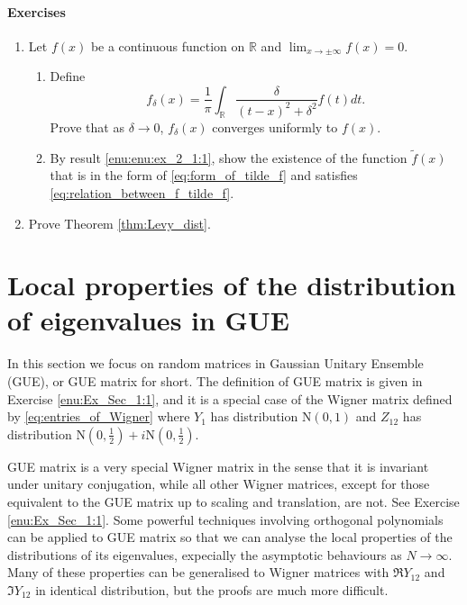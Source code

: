 \documentclass[11pt, a4paper]{article}
\numberwithin{equation}{section}
\newcommand{\realR}{\mathbb{R}}
\newcommand{\Normal}{\mathrm{N}}
\theoremstyle{definition}
\theoremstyle{remark}
\begin{document}
\paragraph{Exercises}

\begin{enumerate}
\item \label{enu:ex_2_1}
  Let $f(x)$ be a continuous function on $\realR$ and $\lim_{x \to \pm \infty} f(x) = 0$.
  \begin{enumerate}
  \item \label{enu:enu:ex_2_1:1}
    Define
    \begin{equation}
      f_{\delta}(x) = \frac{1}{\pi} \int_{\realR} \frac{\delta}{(t - x)^2 + \delta^2} f(t) dt.
    \end{equation}
    Prove that as $\delta \to 0$, $f_{\delta}(x)$ converges uniformly to $f(x)$.
  \item
    By result \ref{enu:enu:ex_2_1:1}, show the existence of the function $\tilde{f}(x)$ that is in the form of \eqref{eq:form_of_tilde_f} and satisfies \eqref{eq:relation_between_f_tilde_f}.
  \end{enumerate}
\item
  Prove Theorem \ref{thm:Levy_dist}.
\end{enumerate}

\section{Local properties of the distribution of eigenvalues in GUE} \label{sec:local_prop_GUE}

In this section we focus on random matrices in Gaussian Unitary Ensemble (GUE), or GUE matrix for short. The definition of GUE matrix is given in Exercise \ref{enu:Ex_Sec_1:1}, and it is a special case of the Wigner matrix defined by \eqref{eq:entries_of_Wigner} where $Y_1$ has distribution $\Normal(0, 1)$ and $Z_{12}$ has distribution $\Normal(0, \frac{1}{2}) + i\Normal(0, \frac{1}{2})$.

GUE matrix is a very special Wigner matrix in the sense that it is invariant under unitary conjugation, while all other Wigner matrices, except for those equivalent to the GUE matrix up to scaling and translation, are not. See Exercise \ref{enu:Ex_Sec_1:1}. Some powerful techniques involving orthogonal polynomials can be applied to GUE matrix so that we can analyse the local properties of the distributions of its eigenvalues, expecially the asymptotic behaviours as $N \to \infty$. Many of these properties can be generalised to Wigner matrices with $\Re Y_{12}$ and $\Im Y_{12}$ in identical distribution, but the proofs are much more difficult.
\end{document}
